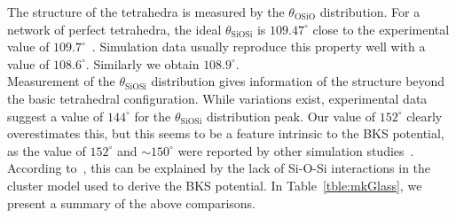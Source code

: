 \documentclass[aps,10pt,twocolumn]{revtex4}
\newcommand{\mrm}[1]{\ensuremath{\mathrm{#1}}\xspace}
\begin{document}
The structure of the tetrahedra is measured by the $\theta_\mrm{OSiO}$ distribution. For a network of perfect
tetrahedra, the ideal $\theta_\mrm{SiOSi}$ is $109.47^\circ$ close to the  experimental value
of $109.7^\circ$~\cite{GrimleyWright90}. Simulation data usually reproduce this property well with
a value of $108.6^\circ$\cite{JundRarivo00,YuanCormack01}. Similarly we obtain $108.9^\circ$.\\
Measurement of the $\theta_\mrm{SiOSi}$ distribution gives information of the structure beyond the
basic tetrahedral configuration. While variations exist, experimental
data~\cite{MozziWarren69,NemilovKhim82,CoombsDeNatale85,Galeener85}  suggest a
value of $144^\circ$ for the $\theta_\mrm{SiOSi}$ distribution peak. Our value of $152^\circ$ clearly
overestimates this, but this seems to be a feature intrinsic to the BKS potential, as the 
value of $152^\circ$ and $\sim 150^\circ$ were reported by other simulation
studies~\cite{YuanCormack03,JundRarivo00,JundJulien99}. According
to~\cite{YuanCormack03}, this can be explained by the lack of Si-O-Si interactions in the cluster
model used to derive the BKS potential. In Table~\ref{tble:mkGlass}, we present a summary of the
above comparisons.\\
\end{document}
